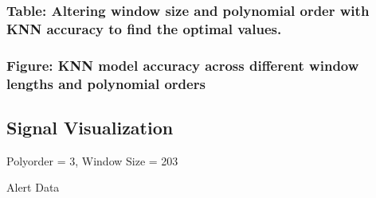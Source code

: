 \documentclass[letterpaper]{article}
\newcommand\textstyleInternetlink[1]{\textcolor[HTML]{0563C1}{#1}}
\begin{document}
\subsubsection[Table: Altering window size and polynomial order with KNN accuracy to find the optimal
values.]{\textbf{Table: }Altering window size and polynomial order with KNN accuracy to find the optimal values.}

\bigskip




\subsubsection[Figure: KNN model accuracy across different window lengths and polynomial
orders]{\textstyleInternetlink{\textbf{\textcolor[HTML]{1F3763}{Figure:}}\textcolor[HTML]{1F3763}{ KNN model accuracy
across different window lengths and polynomial orders}}}

\bigskip


\bigskip

\subsection{Signal Visualization}
Polyorder = 3, Window Size = 203


\bigskip

Alert Data
\end{document}
